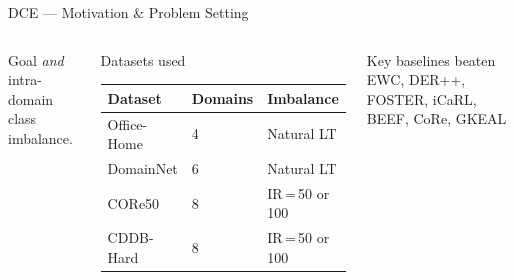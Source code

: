 \documentclass[aspectratio=169,10pt]{beamer}
\begin{document}
\begin{frame}{DCE --- Motivation \& Problem Setting}
\begin{columns}[T]
\begin{block}{Goal}
        \emph{and} intra-domain class imbalance.
      \end{block}
      \begin{block}{Datasets used}
        \footnotesize
        \renewcommand{\arraystretch}{1.2}
        \begin{tabular}{lll}
          \toprule
          Dataset & Domains & Imbalance \\
          \midrule
          Office-Home   & 4  & Natural LT \\
          DomainNet     & 6  & Natural LT \\
          CORe50        & 8  & IR\,=\,50 or 100 \\
          CDDB-Hard     & 8  & IR\,=\,50 or 100 \\
          \bottomrule
        \end{tabular}
      \end{block}
      \vspace{6pt}
      \begin{alertblock}{Key baselines beaten}
        EWC, DER++, FOSTER, iCaRL, BEEF, CoRe, GKEAL
      \end{alertblock}
    \end{columns}
\end{frame}
\end{document}
